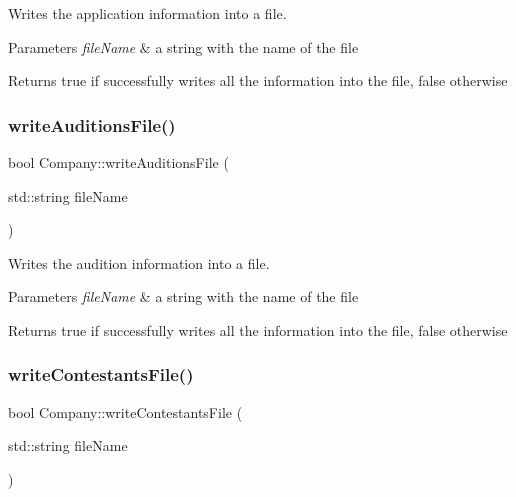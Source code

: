 Writes the application information into a file. 


\begin{DoxyParams}{Parameters}
{\em file\+Name} & a string with the name of the file \\
\hline
\end{DoxyParams}
\begin{DoxyReturn}{Returns}
true if successfully writes all the information into the file, false otherwise 
\end{DoxyReturn}
\mbox{\label{class_company_afe265c202d76f371917835b5ce3f9184}} 
\subsubsection{\texorpdfstring{write\+Auditions\+File()}{writeAuditionsFile()}}
{\footnotesize\ttfamily bool Company\+::write\+Auditions\+File (\begin{DoxyParamCaption}\item[{std\+::string}]{file\+Name }\end{DoxyParamCaption})}



Writes the audition information into a file. 


\begin{DoxyParams}{Parameters}
{\em file\+Name} & a string with the name of the file \\
\hline
\end{DoxyParams}
\begin{DoxyReturn}{Returns}
true if successfully writes all the information into the file, false otherwise 
\end{DoxyReturn}
\mbox{\label{class_company_aa52ac354a5ab3f0e5bc0712bb48cb7b4}} 
\subsubsection{\texorpdfstring{write\+Contestants\+File()}{writeContestantsFile()}}
{\footnotesize\ttfamily bool Company\+::write\+Contestants\+File (\begin{DoxyParamCaption}\item[{std\+::string}]{file\+Name }\end{DoxyParamCaption})}



